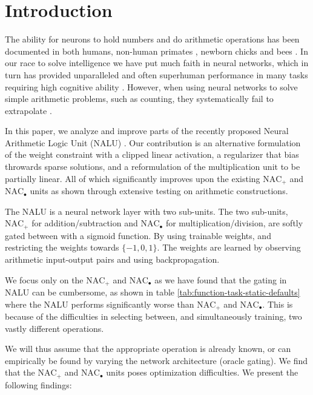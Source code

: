 \section{Introduction}

The ability for neurons to hold numbers and do arithmetic operations has been documented in both humans, non-human primates \cite{nieder-neuronal-number}, newborn chicks \cite{rugani-arithmetic-chicks} and bees \cite{gallistel-numbers-in-brain}.
In our race to solve intelligence we have put much faith in neural networks, which in turn has provided unparalleled and often superhuman performance in many tasks requiring high cognitive ability \cite{natureGo,googleNMT,resnet}.
However, when using neural networks to solve simple arithmetic problems, such as counting, they systematically fail to extrapolate \cite{stillNotSystematic,suzgun2019evaluating,trask-nalu}.

In this paper, we analyze and improve parts of the recently proposed Neural Arithmetic Logic Unit (NALU) \cite{trask-nalu}. Our contribution is an alternative formulation of the weight constraint with a clipped linear activation, a regularizer that bias throwards sparse solutions, and a reformulation of the multiplication unit to be partially linear. All of which significantly improves upon the existing $\text{NAC}_{+}$ and $\text{NAC}_{\bullet}$ units as shown through extensive testing on arithmetic constructions.%

The NALU is a neural network layer with two sub-units. The two sub-units, $\text{NAC}_{+}$ for addition/subtraction and $\text{NAC}_{\bullet}$ for multiplication/division, are softly gated between with a sigmoid function. By using trainable weights, and restricting the weights towards $\{-1,0,1\}$. The weights are learned by observing arithmetic input-output pairs and using backpropagation\cite{rumelhart1986learning}.

We focus only on the $\text{NAC}_{+}$ and $\text{NAC}_{\bullet}$ as we have found that the gating in NALU can be cumbersome, as shown in table \ref{tab:function-task-static-defaults} where the NALU performs significantly worse than $\text{NAC}_{+}$ and $\text{NAC}_{\bullet}$. This is because of the difficulties in selecting between, and simultaneously training, two vastly different operations.

We will thus assume that the appropriate operation is already known, or can empirically be found by varying the network architecture (oracle gating). We find that the $\text{NAC}_{+}$ and $\text{NAC}_{\bullet}$ units poses optimization difficulties. We present the following findings:

